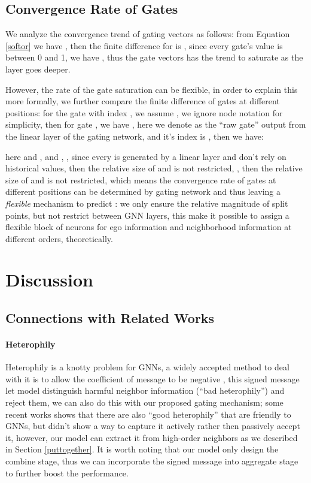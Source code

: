 \documentclass{article}
\begin{document}
\subsection{Convergence Rate of Gates}
\label{proof_conv_speed}
We analyze the convergence trend of gating vectors as follows: from Equation \ref{softor} we have , then the finite difference for  is , since every gate's value is between 0 and 1, we have , thus the gate vectors has the trend to saturate as the layer goes deeper.

However, the rate of the gate saturation can be flexible, in order to explain this more formally, we further compare the finite difference of gates at different positions: for the gate with index , we assume , we ignore node  notation for simplicity, then for gate , we have  , here we denote  as the ``raw gate'' output from the linear layer of the gating network, and it's index is , then we have:



here  and , and , , since every  is generated by a linear layer and don't rely on historical values, then the relative size of  and  is not restricted, , then the relative size of  and  is not restricted, which means the convergence rate of gates at different positions can be determined by gating network and thus leaving a \textit{flexible} mechanism to predict : we only ensure the relative magnitude of split points, but not restrict  between GNN layers, this make it possible to assign a flexible block of neurons for ego information and neighborhood information at different orders, theoretically.




\section{Discussion}
\label{Discussion}
\subsection{Connections with Related Works}

\paragraph{Heterophily}
Heterophily is a knotty problem for GNNs, a widely accepted method to deal with it is to allow the coefficient of message to be negative \citep{chien2020adaptive,yang2021diverse,bo2021beyond,luan2021heterophily,yan2021two}, this signed message let model distinguish harmful neighbor information (``bad heterophily'') and reject them, we can also do this with our proposed gating mechanism; some recent works \citep{luan2021heterophily,ma2021homophily} shows that there are also ``good heterophily'' that are friendly to GNNs, but didn't show a way to capture it actively rather then passively accept it, however, our model can extract it from high-order neighbors as we described in Section \ref{puttogether}. It is worth noting that our model only design the combine stage, thus we can incorporate the signed message into aggregate stage to further boost the performance.
\end{document}
